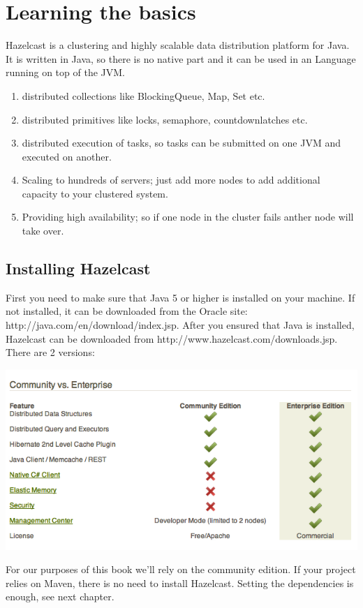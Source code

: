 \chapter{Learning the basics}
Hazelcast is a clustering and highly scalable data distribution platform for Java. It is written in Java, so there 
is no native part and it can be used in an Language running on top of the JVM.


\begin{enumerate}
  \item distributed collections like BlockingQueue, Map, Set etc.
  \item distributed primitives like locks, semaphore, countdownlatches etc.
  \item distributed execution of tasks, so tasks can be submitted on one JVM and executed 
        on another.
  \item Scaling to hundreds of servers; just add more nodes to add additional capacity to your clustered system.
  \item Providing high availability; so if one node in the cluster fails anther node will take over.
\end{enumerate}

\section{Installing Hazelcast}

First you need to make sure that Java 5 or higher is installed on your machine. If not installed, it can 
be downloaded from the Oracle site: http://java.com/en/download/index.jsp. After you ensured that Java is 
installed, Hazelcast can be downloaded from http://www.hazelcast.com/downloads.jsp. There are 2 versions:

\includegraphics[scale=0.60]{hazelcast-editions.png}

For our purposes of this book we'll rely on the community edition. If your project relies on Maven, there 
is no need to install Hazelcast. Setting the dependencies is enough, see next chapter.

